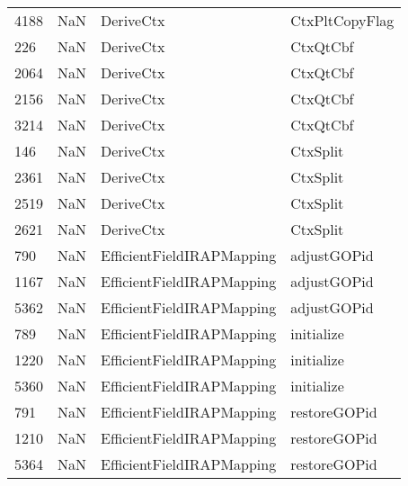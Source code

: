\begin{tabular}{llll}
4188 &                   NaN &                  DeriveCtx &                            CtxPltCopyFlag \\
226  &                   NaN &                  DeriveCtx &                                  CtxQtCbf \\
2064 &                   NaN &                  DeriveCtx &                                  CtxQtCbf \\
2156 &                   NaN &                  DeriveCtx &                                  CtxQtCbf \\
3214 &                   NaN &                  DeriveCtx &                                  CtxQtCbf \\
146  &                   NaN &                  DeriveCtx &                                  CtxSplit \\
2361 &                   NaN &                  DeriveCtx &                                  CtxSplit \\
2519 &                   NaN &                  DeriveCtx &                                  CtxSplit \\
2621 &                   NaN &                  DeriveCtx &                                  CtxSplit \\
790  &                   NaN &  EfficientFieldIRAPMapping &                               adjustGOPid \\
1167 &                   NaN &  EfficientFieldIRAPMapping &                               adjustGOPid \\
5362 &                   NaN &  EfficientFieldIRAPMapping &                               adjustGOPid \\
789  &                   NaN &  EfficientFieldIRAPMapping &                                initialize \\
1220 &                   NaN &  EfficientFieldIRAPMapping &                                initialize \\
5360 &                   NaN &  EfficientFieldIRAPMapping &                                initialize \\
791  &                   NaN &  EfficientFieldIRAPMapping &                              restoreGOPid \\
1210 &                   NaN &  EfficientFieldIRAPMapping &                              restoreGOPid \\
5364 &                   NaN &  EfficientFieldIRAPMapping &                              restoreGOPid \\

\end{tabular}
